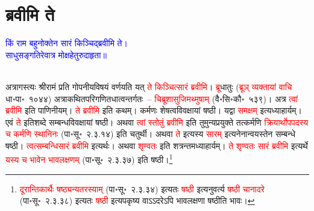\section[ब्रवीमि ते]{ब्रवीमि ते}
\centering\textcolor{blue}{किं राम बहुनोक्तेन सारं किञ्चिद्ब्रवीमि ते।\nopagebreak\\
साधुसङ्गतिरेवात्र मोक्षहेतुरुदाहृता॥}\nopagebreak\\
\\
\begin{sloppypar}\justifying\noindent\hspace{10mm} अत्रागस्त्यः श्रीरामं प्रति गोपनीय\-विषयं वर्णयति यत् \textcolor{red}{ते किञ्चित्सारं ब्रवीमि}। \textcolor{red}{ब्रू}\-धातुः (\textcolor{red}{ब्रूञ् व्यक्तायां वाचि} धा॰पा॰~१०४४) अत्राकथित\-परिगणित\-धात्वन्तर्गतः~– \textcolor{red}{चिब्रूशासुजिमथ्मुषाम्‌} (वै॰सि॰कौ॰~५३९)। अत्र \textcolor{red}{त्वां ब्रवीमि} इति पाणिनीयम्। \textcolor{red}{ते ब्रवीमि} इति कथम्। कर्मणः शेषत्व\-विवक्षायां षष्ठी। यद्वा \textcolor{red}{समक्षम्‌} इत्यध्याहार्यम्। एवं \textcolor{red}{ते} इति\-शब्दे सम्बन्ध\-विवक्षायां षष्ठी। अथवा \textcolor{red}{त्वां स्तोतुं ब्रवीमि} इति तुमुन्यप्रयुक्ते तत्कर्मणि \textcolor{red}{क्रियार्थोपपदस्य च कर्मणि स्थानिनः} (पा॰सू॰~२.३.१४) इति चतुर्थी। अथवा \textcolor{red}{ते} इत्यस्य \textcolor{red}{सारम्‌} इत्यनेनान्वयस्तेन सम्बन्धे षष्ठी। \textcolor{red}{त्वत्सम्बन्धि\-सारं ब्रवीमि} इत्यर्थः। अथवा \textcolor{red}{शृण्वतः} इति शत्रन्तमध्याहार्यम्। \textcolor{red}{ते शृण्वतः सारं ब्रवीमि} इत्यर्थे \textcolor{red}{यस्य च भावेन भाव\-लक्षणम्‌} (पा॰सू॰~२.३.३७) इति षष्ठी।\footnote{\textcolor{red}{दूरान्तिकार्थैः षष्ठ्यन्यतरस्याम्‌} (पा॰सू॰~२.३.३४) इत्यतः \textcolor{red}{षष्ठी} इत्यनुवर्त्य \textcolor{red}{षष्ठी चानादरे} (पा॰सू॰~२.३.३८) इत्यतः \textcolor{red}{षष्ठी} इत्यपकृष्य वाऽऽदरेऽपि भावलक्षणा षष्ठीति भावः।}\end{sloppypar}
